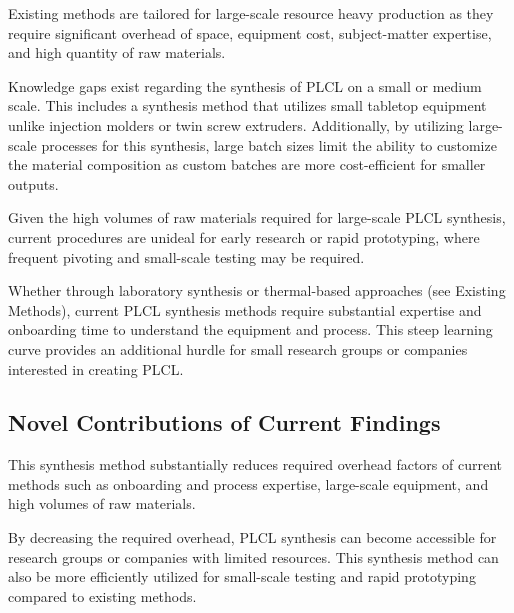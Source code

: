 Existing methods are tailored for large-scale resource heavy production as they require significant overhead of space, equipment cost, subject-matter expertise, and high quantity of raw materials.


Knowledge gaps exist regarding the synthesis of PLCL on a small or medium scale. This includes a synthesis method that utilizes small tabletop equipment unlike injection molders or twin screw extruders. Additionally, by utilizing large-scale processes for this synthesis, large batch sizes limit the ability to customize the material composition as custom batches are more cost-efficient for smaller outputs. 

Given the high volumes of raw materials required for large-scale PLCL synthesis, current procedures are unideal for early research or rapid prototyping, where frequent pivoting and small-scale testing may be required.


Whether through laboratory synthesis or thermal-based approaches (see Existing Methods), current PLCL synthesis methods require substantial expertise and onboarding time to understand the equipment and process. This steep learning curve provides an additional hurdle for small research groups or companies interested in creating PLCL.

\subsection{Novel Contributions of Current Findings}

This synthesis method substantially reduces required overhead factors of current methods such as onboarding and process expertise, large-scale equipment, and high volumes of raw materials.

By decreasing the required overhead, PLCL synthesis can become accessible for research groups or companies with limited resources. This synthesis method can also be more efficiently utilized for small-scale testing and rapid prototyping compared to existing methods.

